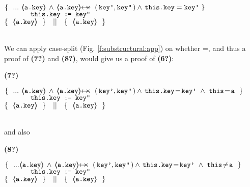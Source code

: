 \begin{example}
{{\begin{minipage}{.95\textwidth}
\begin{flushleft}
$\{ \  \   ... \   {\inside{\prg{a.key}}} \, \wedge \, \protectedFrom {\prg{a.key}} { (\, \prg{key'},\prg{key''}\, )}  \wedge  \,  \prg{this.key}=\prg{key'}\  \} \ $\\
$\ \ \ \ \ \ \ \ \ \ \  \mbox{\normalfont{\texttt{this.key := key''}}}\   $\\
$  \{\  \  {\inside{\prg{a.key}}}\   \   \} \ \ \  || \ \ \ \{  \ \  {\inside{\prg{a.key}}}\  \  \}  $ 
\end{flushleft}
\end{minipage}
}}
\\
 \vspace{.03cm}
\noindent
We can apply case-split  (\cf Fig. \ref{f:substructural:app}) on whether =, and thus a proof of \textbf{(7?)} and \textbf{(8?)}, would give us a proof of \textbf{(6?)}:\\
 \vspace{.03cm}
{\small{  \begin{minipage}{.05\textwidth}
   \textbf{(7?)}\ \ 
\end{minipage}
\hfill
\begin{minipage}{.95\textwidth}
\begin{flushleft}
$\{ \  \   ... \   {\inside{\prg{a.key}}} \, \wedge \, \protectedFrom {\prg{a.key}} { (\, \prg{key'},\prg{key''}\, )} \wedge  \,  \prg{this.key}\!=\!\prg{key'}\ \wedge\ \prg{this}\!=\!\prg{a} \ \  \} \ $\\
$\ \ \ \ \ \ \ \ \ \ \   \mbox{\normalfont{\texttt{this.key := key''}}}\    $\\
$  \{\  \      {\inside{\prg{a.key}}} \   \   \} \ \ \  || \ \ \ \{  \ \  {\inside{\prg{a.key}}} \ \  \}  $ 
\end{flushleft}
\end{minipage}
}}
\\
and also
\\
 \vspace{.03cm}
{\small{  \begin{minipage}{.05\textwidth}
   \textbf{(8?)}\ \ 
\end{minipage}
\hfill
\begin{minipage}{.95\textwidth}
\begin{flushleft}
$\{ \  \   ...   {\inside{\prg{a.key}}} \, \wedge \, \protectedFrom {\prg{a.key}} { (\, \prg{key'},\prg{key''}\, )}  \wedge  \,  \prg{this.key}\!=\!\prg{key'}\ \wedge\ \prg{this}\!\neq\!\prg{a} \ \ \} \ $\\
$\ \ \ \ \ \ \ \ \ \ \  \mbox{\normalfont{\texttt{this.key := key''}}}\   $\\
$  \{\  \   {\inside{\prg{a.key}}}  \  \  \}\ \ \  || \ \ \ \{  \ \  {\inside{\prg{a.key}}} \ \  \}  $ 
\end{flushleft}
\end{minipage}
}}
 

\end{example}

